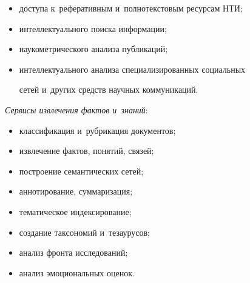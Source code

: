     \begin{itemize}

\item доступа к~реферативным и~полнотекстовым ресурсам НТИ;\\[-13.5pt]

\item интеллектуального поиска информации;\\[-13.5pt]

\item наукометрического анализа публикаций;\\[-13.5pt]

\item интеллектуального анализа специализированных социальных 

сетей и~других средств научных коммуникаций.

\end{itemize}



    \textit{Сервисы извлечения фактов и~знаний}:

    \begin{itemize}

\item классификация и~рубрикация документов;\\[-13.5pt]

\item извлечение фактов, понятий, связей;\\[-13.5pt]

\item построение семантических сетей;\\[-13.5pt]

\item аннотирование, суммаризация;\\[-13.5pt]

\item тематическое индексирование;\\[-13.5pt]

\item создание таксономий и~тезаурусов;\\[-13.5pt]

\item анализ фронта исследований;\\[-13.5pt]

\item анализ эмоциональных оценок.

\end{itemize}



